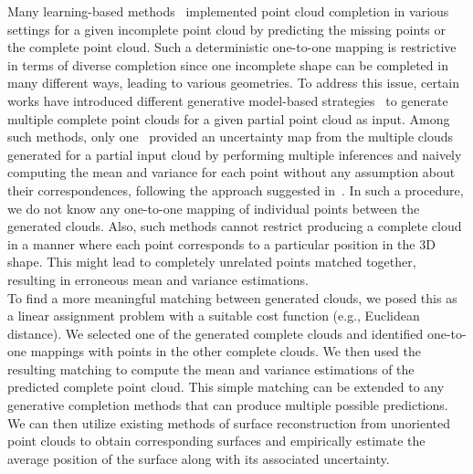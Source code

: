 Many learning-based methods~\cite{PCN, PoinTr, PointAttN, P2C, VarPCN, PCNSkip, Snowflake} implemented point cloud completion in various settings for a given incomplete point cloud by predicting the missing points or the complete point cloud. Such a deterministic one-to-one mapping is restrictive in terms of diverse completion since one incomplete shape can be completed in many different ways, leading to various geometries. To address this issue, certain works have introduced different generative model-based strategies~\cite{HyperPocket, CGAN, PCCIMLE, EBResLT} to generate multiple complete point clouds for a given partial point cloud as input. Among such methods, only one~\cite{EBResLT} provided an uncertainty map from the multiple clouds generated for a partial input cloud by performing multiple inferences and naively computing the mean and variance for each point without any assumption about their correspondences, following the approach suggested in~\cite{UncertDeepL}. In such a procedure, we do not know any one-to-one mapping of individual points between the generated clouds. Also, such methods cannot restrict producing a complete cloud in a manner where each point corresponds to a particular position in the 3D shape. This might lead to completely unrelated points matched together, resulting in erroneous mean and variance estimations.
\\
To find a more meaningful matching between generated clouds, we posed this as a linear assignment problem with a suitable cost function (e.g., Euclidean distance). We selected one of the generated complete clouds and identified one-to-one mappings with points in the other complete clouds. We then used the resulting matching to compute the mean and variance estimations of the predicted complete point cloud. This simple matching can be extended to any generative completion methods that can produce multiple possible predictions. We can then utilize existing methods of surface reconstruction from unoriented point clouds to obtain corresponding surfaces and empirically estimate the average position of the surface along with its associated uncertainty.
\newline
 
